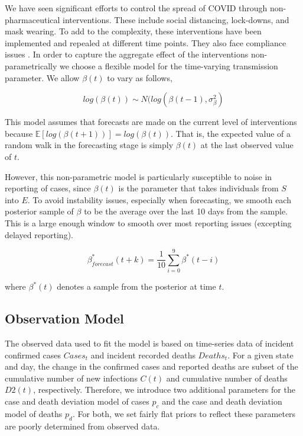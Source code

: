 \documentclass[11pt]{amsart}
\begin{document}
We have seen significant efforts to control the spread of COVID through non-pharmaceutical interventions. These include social distancing, lock-downs, and mask wearing. To add to the complexity, these interventions have been implemented and repealed at different time points. They also face compliance issues \cite{simonov2020persuasive}. In order to capture the aggregate effect of the interventions non-parametrically we choose a flexible model for the time-varying transmission parameter.
We allow $\beta(t)$ to vary as follows, 

\begin{equation}
log(\beta(t)) \sim N(log(\beta(t-1), \sigma_{\beta}^2)
\end{equation}

This model assumes that forecasts are made on the current level of interventions because $\mathbb{E}[log(\beta(t+1))] = log(\beta(t))$. That is, the expected value of a random walk in the forecasting stage is simply $\beta(t)$ at the last observed value of $t$. 

However, this non-parametric model is particularly susceptible to noise in reporting of cases, since $\beta(t)$ is the parameter that takes individuals from $S$ into $E$. To avoid instability issues, especially when forecasting, we smooth each posterior sample of $\beta$ to be the average over the last 10 days from the sample. This is a large enough window to smooth over most reporting issues (excepting delayed reporting). 

\begin{equation}
\beta^*_{forecast}(t+k) = \frac{1}{10}\sum_{i=0}^{9}\beta^*(t-i)
\end{equation}

where $\beta^*(t)$ denotes a sample from the posterior at time $t$.

% 
 \subsection{Observation Model}
 
 The observed data used to fit the model is based on time-series data of incident confirmed cases $Cases_{t}$ and incident recorded deaths $Deaths_{t}$. 
For a given state and day, the change in the  confirmed cases and reported deaths are subset of the cumulative number of new infections $C(t)$ and cumulative number of deaths $D2(t)$, respectively. Therefore, we introduce two additional parameters for the case and death deviation model of cases $p_c$ and the case and death deviation model of deaths $p_d$. For both, we set fairly flat priors to reflect these parameters are poorly determined from observed data.
\end{document}

